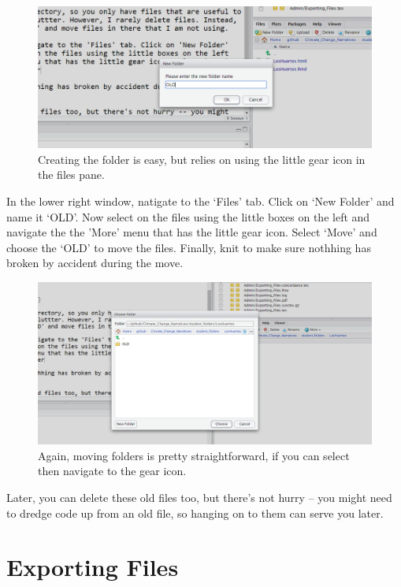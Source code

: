 \documentclass{article}\usepackage[]{graphicx}\usepackage[]{color}
\begin{document}
\begin{figure}
\includegraphics[width=\textwidth]{CreateFolder}
\caption{Creating the folder is easy, but relies on using the little gear icon in the files pane.}
\end{figure}

In the lower right window, natigate to the `Files' tab. Click on `New Folder' and name it `OLD'. Now select on the files using the little boxes on the left and navigate the the 'More' menu that has the little gear icon. Select `Move' and choose the `OLD' to move the files. Finally, knit to make sure nothhing has broken by accident during the move. 

\begin{figure}
\includegraphics[width=\textwidth]{MoveFiles}
\caption{Again, moving folders is pretty straightforward, if you can select then navigate to the gear icon.}
\end{figure}


Later, you can delete these old files too, but there's not hurry -- you might need to dredge code up from an old file, so hanging on to them can serve you later. 

\section{Exporting Files}
\end{document}

